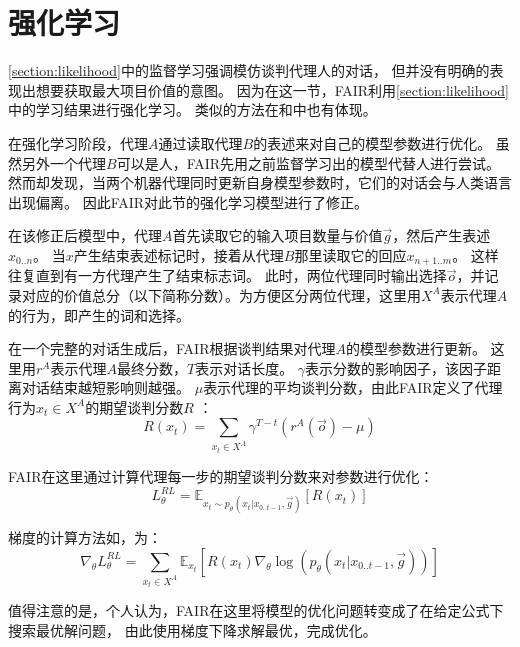 \section{强化学习}
\label{section:reinforcement}

\ref{section:likelihood}中的监督学习强调模仿谈判代理人的对话，
但并没有明确的表现出想要获取最大项目价值的意图。
因为在这一节，FAIR利用\ref{section:likelihood}中的学习结果进行强化学习。
类似的方法在\citet{LiMonroe-20}和\citet{DasKottur-21}中也有体现。

在强化学习阶段，代理$A$通过读取代理$B$的表述来对自己的模型参数进行优化。
虽然另外一个代理$B$可以是人，FAIR先用之前监督学习出的模型代替人进行尝试。
然而却发现，当两个机器代理同时更新自身模型参数时，它们的对话会与人类语言出现偏离。
因此FAIR对此节的强化学习模型进行了修正。


在该修正后模型中，代理$A$首先读取它的输入项目数量与价值$\vec{g}$，然后产生表述$x_{0.. n}$。
当$x$产生结束表述标记时，接着从代理$B$那里读取它的回应$x_{n+1.. m}$。
这样往复直到有一方代理产生了结束标志词。
此时，两位代理同时输出选择$\vec{o}$，并记录对应的价值总分（以下简称分数）。为方便区分两位代理，这里用$X^A$表示代理$A$的行为，即产生的词和选择。

在一个完整的对话生成后，FAIR根据谈判结果对代理$A$的模型参数进行更新。
这里用$r^A$表示代理$A$最终分数，$T$表示对话长度。
$\gamma$表示分数的影响因子，该因子距离对话结束越短影响则越强。
$\mu$表示代理的平均谈判分数，由此FAIR定义了代理行为$x_t\in X^A$的期望谈判分数$R$ ：
\begin{equation}
\label{eq:reinforcement}
R(x_t) = \sum_{x_t\in X^{A}}\gamma^{T-t}(r^A(\vec{o}) - \mu)
\end{equation}

FAIR在这里通过计算代理每一步的期望谈判分数来对参数进行优化：
\begin{equation}
L^{RL}_\theta = \mathbb{E}_{x_{t}\sim p_\theta(x_{t}|x_{0..t-1},\vec{g})}[R(x_t)]
\end{equation}

梯度的计算方法如\citet{Williams-22}，为：
\begin{equation}
\nabla_\theta L^{RL}_\theta = \!\!\!\!\!\sum_{x_t\in X^{A}}\!\!\!\mathbb{E}_{x_t}[R(x_t)\nabla_\theta \log(p_\theta(x_{t}|x_{0..t-1},\vec{g}))]
\end{equation}

值得注意的是，个人认为，FAIR在这里将模型的优化问题转变成了在给定公式下搜索最优解问题，
由此使用梯度下降求解最优，完成优化。

